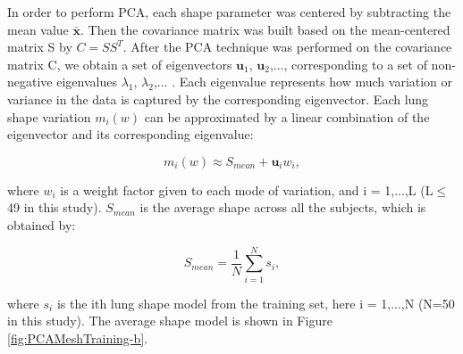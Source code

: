 {In order to perform PCA, each shape parameter was centered by subtracting the mean value $\mathbf{\bar{x}}$. Then the covariance matrix was built based on the mean-centered matrix S by $C = SS^T$. After the PCA technique was performed on the covariance matrix C, we obtain a set of eigenvectors $\mathbf{u}_1$, $\mathbf{u}_2$,..., corresponding to a set of non-negative eigenvalues $\lambda_1$, $\lambda_2$,... . Each eigenvalue represents how much variation or variance in the data is captured by the corresponding eigenvector. Each lung shape variation $m_i(w)$ can be approximated by a linear combination of the eigenvector and its corresponding eigenvalue:

\begin{equation}
 \label{eq:PCAConstruction3}
 m_i(w) \approx S_{mean} + \mathbf{u}_i w_i,
\end{equation}

\noindent where $w_i$ is a weight factor given to each mode of variation, and i = 1,...,L (L$\leq$ 49 in this study). $S_{mean}$ is the average shape across all the subjects, which is obtained by:

\begin{equation}
 \label{eq:PCAConstruction4}
 S_{mean} = \frac{1}{N}\sum_{i=1}^N s_i,
\end{equation}

 \noindent where $s_i$ is the ith lung shape model from the training set, here i = 1,...,N (N=50 in this study). The average shape model is shown in Figure \ref{fig:PCAMeshTraining-b}.

}
